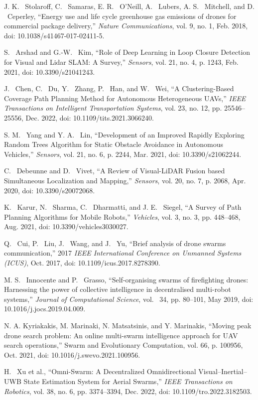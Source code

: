 \documentclass[preprint,12pt]{elsarticle}
\begin{document}
\begin{thebibliography}{1}
J. K. ~Stolaroff, C. ~Samaras, E. R. ~O’Neill, A. ~Lubers, A. S. ~Mitchell, and D. ~Ceperley, “Energy use and life cycle greenhouse gas emissions of drones for commercial package delivery,” \emph{Nature Communications}, vol. 9, no. 1, Feb. 2018, doi: 10.1038/s41467-017-02411-5.

S. ~Arshad and G.-W. ~Kim, “Role of Deep Learning in Loop Closure Detection for Visual and Lidar SLAM: A Survey,” \emph{Sensors}, vol. 21, no. 4, p. 1243, Feb. 2021, doi: 10.3390/s21041243.

J. ~Chen, C. ~Du, Y. ~Zhang, P. ~Han, and W. ~Wei, “A Clustering-Based Coverage Path Planning Method for Autonomous Heterogeneous UAVs,” \emph{IEEE Transactions on Intelligent Transportation Systems}, vol. 23, no. 12, pp. 25546–25556, Dec. 2022, doi: 10.1109/tits.2021.3066240.

S. M. ~Yang and Y. A. ~Lin, “Development of an Improved Rapidly Exploring Random Trees Algorithm for Static Obstacle Avoidance in Autonomous Vehicles,” \emph{Sensors}, vol. 21, no. 6, p. 2244, Mar. 2021, doi: 10.3390/s21062244.

C. ~Debeunne and D. ~Vivet, “A Review of Visual-LiDAR Fusion based Simultaneous Localization and Mapping,” \emph{Sensors}, vol. 20, no. 7, p. 2068, Apr. 2020, doi: 10.3390/s20072068.

K. ~Karur, N. ~Sharma, C. ~Dharmatti, and J. E. ~Siegel, “A Survey of Path Planning Algorithms for Mobile Robots,” \emph{Vehicles}, vol. 3, no. 3, pp. 448–468, Aug. 2021, doi: 10.3390/vehicles3030027.

Q. ~Cui, P. ~Liu, J. ~Wang, and J. ~Yu, “Brief analysis of drone swarms communication,” 2017 \emph{IEEE International Conference on Unmanned Systems (ICUS)}, Oct. 2017, doi: 10.1109/icus.2017.8278390.

M. S. ~Innocente and P. ~Grasso, “Self-organising swarms of firefighting drones: Harnessing the power of collective intelligence in decentralised multi-robot systems,” \emph{Journal of Computational Science}, vol. ~34, pp. 80–101, May 2019, doi: 10.1016/j.jocs.2019.04.009.

N. A. Kyriakakis, M. Marinaki, N. Matsatsinis, and Y. Marinakis, “Moving peak drone search problem: An online multi-swarm intelligence approach for UAV search operations,” Swarm and Evolutionary Computation, vol. 66, p. 100956, Oct. 2021, doi: 10.1016/j.swevo.2021.100956.

H. ~Xu et al., “Omni-Swarm: A Decentralized Omnidirectional Visual–Inertial–UWB State Estimation System for Aerial Swarms,” \emph{IEEE Transactions on Robotics}, vol. 38, no. 6, pp. 3374–3394, Dec. 2022, doi: 10.1109/tro.2022.3182503.


\end{thebibliography}
\end{document}
